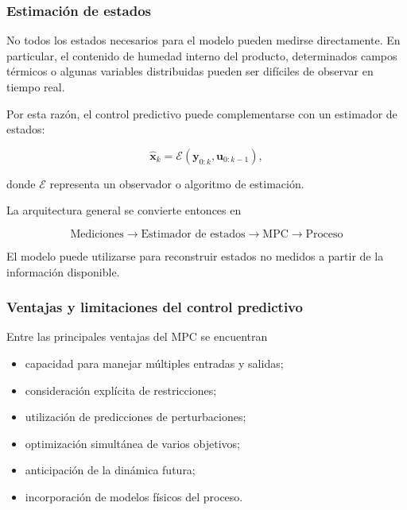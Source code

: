 \subsubsection{Estimación de estados}

No todos los estados necesarios para el modelo pueden medirse directamente. En particular, el contenido de humedad interno del producto, determinados campos térmicos o algunas variables distribuidas pueden ser difíciles de observar en tiempo real.

Por esta razón, el control predictivo puede complementarse con un estimador de estados:

\begin{equation}
\hat{\mathbf{x}}_k
=
\mathcal{E}
\left(
\mathbf{y}_{0:k},
\mathbf{u}_{0:k-1}
\right),
\end{equation}

donde $\mathcal{E}$ representa un observador o algoritmo de estimación.

La arquitectura general se convierte entonces en

\begin{equation}
\boxed{
\text{Mediciones}
\rightarrow
\text{Estimador de estados}
\rightarrow
\text{MPC}
\rightarrow
\text{Proceso}
}
\end{equation}

El modelo puede utilizarse para reconstruir estados no medidos a partir de la información disponible.

\subsubsection{Ventajas y limitaciones del control predictivo}

Entre las principales ventajas del MPC se encuentran

\begin{itemize}
    \item capacidad para manejar múltiples entradas y salidas;
    \item consideración explícita de restricciones;
    \item utilización de predicciones de perturbaciones;
    \item optimización simultánea de varios objetivos;
    \item anticipación de la dinámica futura;
    \item incorporación de modelos físicos del proceso.
\end{itemize}

